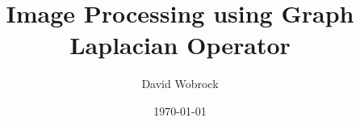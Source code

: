 \documentclass[]{kththesis}
\title{Image Processing using Graph Laplacian Operator}
\author{David Wobrock}
\date{\today}
\begin{document}
\frontmatter %

\titlepage

\begin{abstract}
 
\end{abstract}

\begin{otherlanguage}{swedish}
  \begin{abstract}
   
  \end{abstract}
\end{otherlanguage}

\begin{otherlanguage}{french}
  \begin{abstract}
   
  \end{abstract}
\end{otherlanguage}

\tableofcontents

\mainmatter %









\clearpage
\printbibliography

%
%
\end{document}

